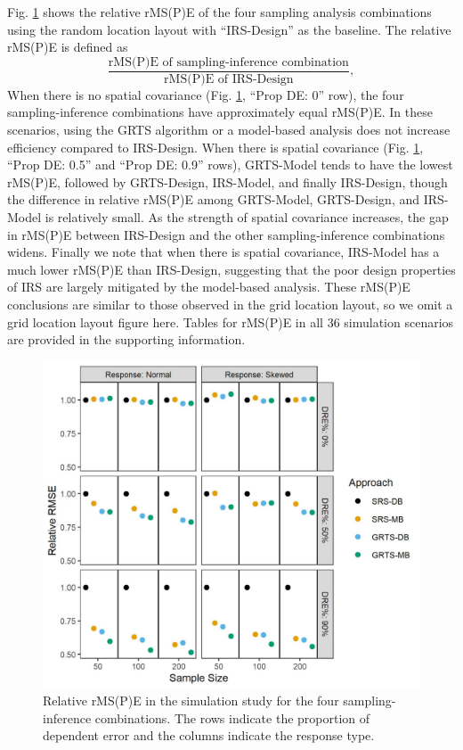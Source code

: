 \documentclass[]{elsarticle} %
\begin{document}
Fig. \ref{fig:rmspe_eff} shows the relative rMS(P)E of the four sampling
analysis combinations using the random location layout with
``IRS-Design'' as the baseline. The relative rMS(P)E is defined as
\begin{equation*}
\frac{\text{rMS(P)E of sampling-inference combination}}{\text{rMS(P)E of IRS-Design}},
\end{equation*} When there is no spatial covariance (Fig.
\ref{fig:rmspe_eff}, ``Prop DE: 0'' row), the four sampling-inference
combinations have approximately equal rMS(P)E. In these scenarios, using
the GRTS algorithm or a model-based analysis does not increase
efficiency compared to IRS-Design. When there is spatial covariance
(Fig. \ref{fig:rmspe_eff}, ``Prop DE: 0.5'' and ``Prop DE: 0.9'' rows),
GRTS-Model tends to have the lowest rMS(P)E, followed by GRTS-Design,
IRS-Model, and finally IRS-Design, though the difference in relative
rMS(P)E among GRTS-Model, GRTS-Design, and IRS-Model is relatively
small. As the strength of spatial covariance increases, the gap in
rMS(P)E between IRS-Design and the other sampling-inference combinations
widens. Finally we note that when there is spatial covariance, IRS-Model
has a much lower rMS(P)E than IRS-Design, suggesting that the poor
design properties of IRS are largely mitigated by the model-based
analysis. These rMS(P)E conclusions are similar to those observed in the
grid location layout, so we omit a grid location layout figure here.
Tables for rMS(P)E in all 36 simulation scenarios are provided in the
supporting information.

\begin{figure}
  \centering
  \includegraphics[width = 1\linewidth]{figures/rmspe_eff.jpeg}
  \caption{Relative rMS(P)E in the simulation study for the four sampling-inference combinations. The rows indicate the proportion of dependent error and the columns indicate the response type.}
  \label{fig:rmspe_eff}
\end{figure}
\end{document}
